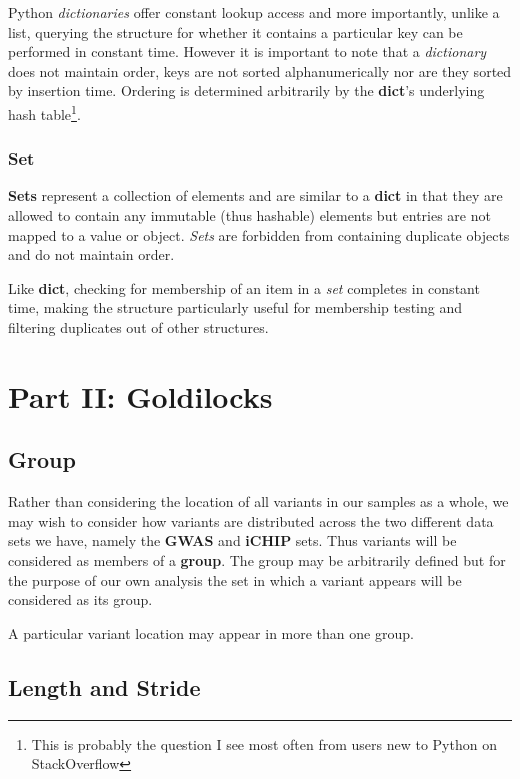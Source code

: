 Python \textit{dictionaries} offer constant lookup access and more importantly,
unlike a list, querying the structure for whether it contains a particular key
can be performed in constant time\citep{py:timecomplexity}.
However it is important to note that a \textit{dictionary} does not maintain
order, keys are not sorted alphanumerically nor are they sorted by insertion
time. Ordering is determined arbitrarily by the \textbf{dict}'s underlying hash
table\footnote{This is probably the question I see most often from users new to
Python on StackOverflow}.


\subsubsection{Set}

\textbf{Sets}\citep{py-set} represent a collection of elements and are similar
to a \textbf{dict} in that they are allowed to contain any immutable (thus
hashable) elements but entries are not mapped to a value or object.
\textit{Sets} are forbidden from containing duplicate objects and do not
maintain order.

Like \textbf{dict}, checking for membership of an item in a \textit{set}
completes in constant time, making the structure particularly useful for
membership testing and filtering duplicates out of other structures.



\section{Part II: Goldilocks}
\label{app:concepts-p2-1}
\subsection{Group}

Rather than considering the location of all variants in our samples as a whole,
we may wish to consider how variants are distributed across the two different
data sets we have, namely the \textbf{GWAS} and \textbf{iCHIP} sets. Thus variants
will be considered as members of a \textbf{group}. The group may be
arbitrarily defined but for the purpose of our own analysis the set in which a
variant appears will be considered as its group.

A particular variant location may appear in more than one group.


\subsection{Length and Stride}
\label{sec:lengthstride}

